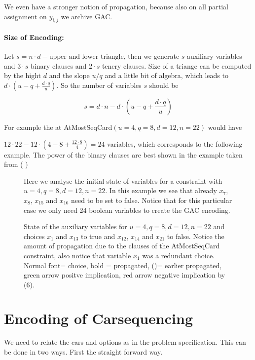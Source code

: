 \documentclass[]{llncs}
\newcommand{\TODO}[1]{ {\color{red}{#1} }}
\begin{document}
We even have a stronger notion of propagation, because also on all
partial assignment on $y_{i,j}$ we archive GAC. 

\paragraph{Size of Encoding: } Let $s = n\cdot d-\text{upper and lower
triangle}$, then we generate $s$ auxiliary variables and $3\cdot s$
binary clauses and $2\cdot s$ tenery clauses. Size of a triange can be
computed by the hight $d$ and the slope $u/q$ and a little bit of
algebra, which leads to $d\cdot(u-q+\frac{d \cdot q}{u}) $. So the
number of variables $s$ should be

$$ s = d \cdot n - d \cdot(u-q+\frac{d \cdot q}{u}) $$

For example the at AtMostSeqCard$(u=4,q=8,d=12,n=22)$ would have 

$ 12\cdot 22- 12\cdot ( 4-8+\frac{12 \cdot 8}{4}) = 24$ variables, which
corresponds to the following example.  The power of the binary clauses
are best shown in the example taken from (\TODO{ref})

\begin{figure}
\centering 
\caption{Here we analyse the initial state of variables for a constraint
    with $u=4,q=8,d=12,n=22$. In this example we see that already
    $x_{7}$, $x_{8}$, $x_{15}$ and $x_{16}$ need to be set to false.
    Notice that for this particular case we only need 24 boolean
    variables to create the GAC encoding.}
%
\end{figure}

\begin{figure}
\centering 
\caption{State of the auxiliary variables for $u=4,q=8,d=12,n=22$ and
    choices $x_{1}$ and $x_{13}$ to true and $x_{12}$, $x_{14}$ and
    $x_{21}$ to false. Notice the amount of propagation due to the
    clauses of the AtMostSeqCard constraint, also notice that variable
$x_{1}$ was a redundant choice. Normal font= choice, bold = propagated,
()= earlier propagated, green arrow positve implication, red arrow
negative implication by (6).}
%
\end{figure}

\section{Encoding of Carsequencing}

We need to relate the cars and options as in the problem specification.
This can be done in two ways. First the straight forward way. 
\end{document}
